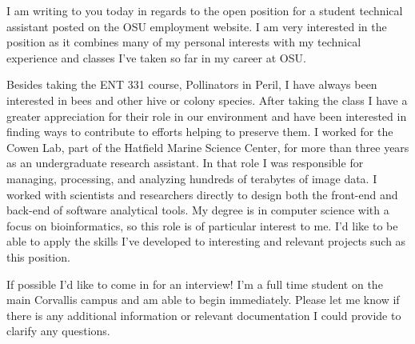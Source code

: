 \documentclass[10pt,stdletter,dateno,sigleft]{newlfm} %
\begin{document}
\begin{newlfm}


I am writing to you today in regards to the open position for a student technical assistant posted on the OSU employment website. I am very interested in the position as it combines many of my personal interests with my technical experience and classes I've taken so far in my career at OSU. 

Besides taking the ENT 331 course, Pollinators in Peril, I have always been interested in bees and other hive or colony species. After taking the class I have a greater appreciation for their role in our environment and have been interested in finding ways to contribute to efforts helping to preserve them. I worked for the Cowen Lab, part of the Hatfield Marine Science Center, for more than three years as an undergraduate research assistant. In that role I was responsible for managing, processing, and analyzing hundreds of terabytes of image data. I worked with scientists and researchers directly to design both the front-end and back-end of software analytical tools. My degree is in computer science with a focus on bioinformatics, so this role is of particular interest to me. I'd like to be able to apply the skills I've developed to interesting and relevant projects such as this position. 

If possible I'd like to come in for an interview! I'm a full time student on the main Corvallis campus and am able to begin immediately. Please let me know if there is any additional information or relevant documentation I could provide to clarify any questions. 


\end{newlfm}
\end{document}
